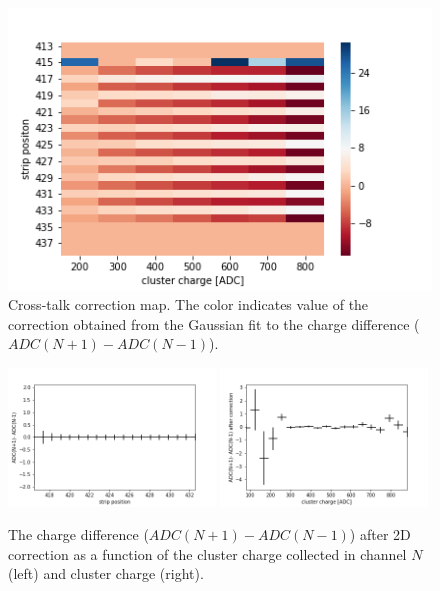 \begin{figure}[htb]
\begin{center}
\includegraphics[scale=0.7]{figures/eta/correction_2d.png} 
\caption{Cross-talk correction map. The color indicates value of the correction obtained from the Gaussian fit to the charge difference ($ADC(N+1) - ADC(N-1)$).}
\label{fig:correction_map}
 \end{center}
 \end{figure}

\begin{figure}[h]
\begin{center}
\includegraphics[width = 0.49\textwidth]{figures/eta/difference_ac.png} 
\includegraphics[width = 0.49\textwidth]{figures/eta/difference_vs_charge_ac.png}
\caption{The charge difference ($ADC(N+1) - ADC(N-1)$) after 2D correction as a function of the cluster charge collected in channel $N$ (left) and cluster charge (right). }
\label{fig:after_correction}
 \end{center}
 \end{figure}

